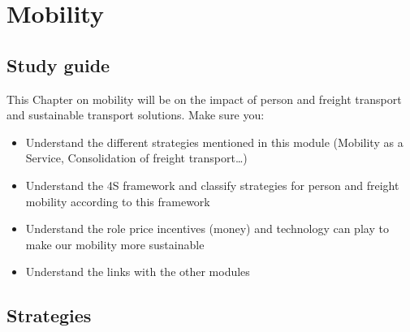 \documentclass[../summary.tex]{subfiles}
\begin{document}
	
	\section{Mobility}
	
	\subsection{Study guide}
	
	This Chapter on mobility will be on the impact of person and freight transport and sustainable transport solutions. Make sure you:
	\begin{itemize}
	\item Understand the different strategies mentioned in this module (Mobility as a Service, Consolidation of freight transport…)
	\item Understand the 4S framework and classify strategies for person and freight mobility according to this framework
	\item Understand the role price incentives (money) and technology can play to make our mobility more sustainable
	\item Understand the links with the other modules
	\end{itemize}
	
	\subsection{Strategies}
	
\end{document}
